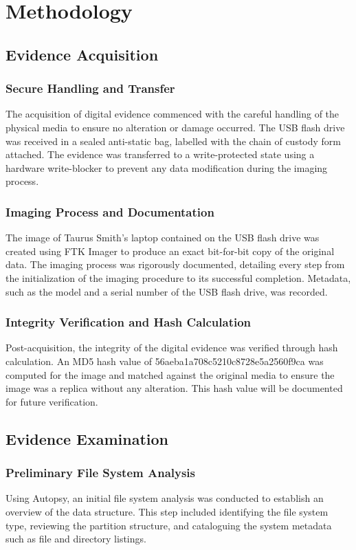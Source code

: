 \chapter{Methodology}

\section{Evidence Acquisition}

\subsection{Secure Handling and Transfer}
The acquisition of digital evidence commenced with the careful handling of the physical media to ensure no alteration or damage occurred. The USB flash drive was received in a sealed anti-static bag, labelled with the chain of custody form attached. The evidence was transferred to a write-protected state using a hardware write-blocker to prevent any data modification during the imaging process.

\subsection{Imaging Process and Documentation}
The image of Taurus Smith's laptop contained on the USB flash drive was created using FTK Imager to produce an exact bit-for-bit copy of the original data. The imaging process was rigorously documented, detailing every step from the initialization of the imaging procedure to its successful completion. Metadata, such as the model and a serial number of the USB flash drive, was recorded.

\subsection{Integrity Verification and Hash Calculation}
Post-acquisition, the integrity of the digital evidence was verified through hash calculation. An MD5 hash value of 56aeba1a708c5210c8728e5a2560f9ca was computed for the image and matched against the original media to ensure the image was a replica without any alteration. This hash value will be documented for future verification.

\section{Evidence Examination}

\subsection{Preliminary File System Analysis}
Using Autopsy, an initial file system analysis was conducted to establish an overview of the data structure. This step included identifying the file system type, reviewing the partition structure, and cataloguing the system metadata such as file and directory listings.

